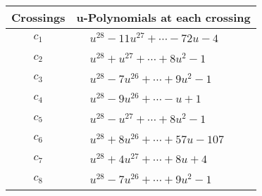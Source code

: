 \documentclass[1p]{elsarticle_modified}
\theoremstyle{definition}
\begin{document}
\begin{tabular}{m{50pt}|m{274pt}}
Crossings & \hspace{64pt}u-Polynomials at each crossing \\
\hline $$\begin{aligned}c_{1}\end{aligned}$$&$\begin{aligned}
&u^{28}-11 u^{27}+\cdots-72 u-4
\end{aligned}$\\
\hline $$\begin{aligned}c_{2}\end{aligned}$$&$\begin{aligned}
&u^{28}+u^{27}+\cdots+8 u^2-1
\end{aligned}$\\
\hline $$\begin{aligned}c_{3}\end{aligned}$$&$\begin{aligned}
&u^{28}-7 u^{26}+\cdots+9 u^2-1
\end{aligned}$\\
\hline $$\begin{aligned}c_{4}\end{aligned}$$&$\begin{aligned}
&u^{28}-9 u^{26}+\cdots- u+1
\end{aligned}$\\
\hline $$\begin{aligned}c_{5}\end{aligned}$$&$\begin{aligned}
&u^{28}- u^{27}+\cdots+8 u^2-1
\end{aligned}$\\
\hline $$\begin{aligned}c_{6}\end{aligned}$$&$\begin{aligned}
&u^{28}+8 u^{26}+\cdots+57 u-107
\end{aligned}$\\
\hline $$\begin{aligned}c_{7}\end{aligned}$$&$\begin{aligned}
&u^{28}+4 u^{27}+\cdots+8 u+4
\end{aligned}$\\
\hline $$\begin{aligned}c_{8}\end{aligned}$$&$\begin{aligned}
&u^{28}-7 u^{26}+\cdots+9 u^2-1
\end{aligned}$\\

\end{tabular}
\end{document}
